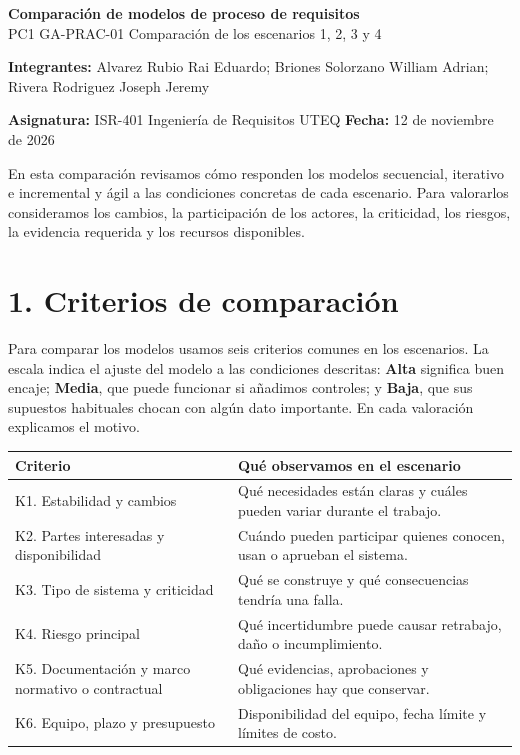 \documentclass[10pt,letterpaper]{article}
\newcommand{\separa}{\hspace{0.25em}\raisebox{0.25ex}{\rule{0.38ex}{0.38ex}}\hspace{0.25em}}
\newcommand{\titulo}[1]{\section*{\textcolor{verde}{#1}}}
\begin{document}
\par
\begin{center}
{\Large\bfseries\textcolor{verde}{Comparación de modelos de proceso de requisitos}}\\[3pt]
{\large PC1 \separa GA-PRAC-01 \separa Comparación de los escenarios 1, 2, 3 y 4}
\end{center}
\par
\vspace{3pt}
\par
\textbf{Integrantes:} Alvarez Rubio Rai Eduardo; Briones Solorzano William Adrian; Rivera Rodriguez Joseph Jeremy\\
\par
\textbf{Asignatura:} ISR-401 \separa Ingeniería de Requisitos \separa UTEQ \hfill \textbf{Fecha:} 12 de noviembre de 2026\\
\par
En esta comparación revisamos cómo responden los modelos secuencial, iterativo e incremental y ágil a las condiciones concretas de cada escenario. Para valorarlos consideramos los cambios, la participación de los actores, la criticidad, los riesgos, la evidencia requerida y los recursos disponibles.
\par
\titulo{1. Criterios de comparación}
\par
Para comparar los modelos usamos seis criterios comunes en los escenarios. La escala indica el ajuste del modelo a las condiciones descritas: \textbf{Alta} significa buen encaje; \textbf{Media}, que puede funcionar si añadimos controles; y \textbf{Baja}, que sus supuestos habituales chocan con algún dato importante. En cada valoración explicamos el motivo.
\par
\small
\par
\begin{tabularx}{\linewidth}{@{}p{3.4cm}Y@{}}
\color{white}\textbf{Criterio}&\color{white}\textbf{Qué observamos en el escenario}\\\midrule
K1. Estabilidad y cambios&Qué necesidades están claras y cuáles pueden variar durante el trabajo.\\
K2. Partes interesadas y disponibilidad&Cuándo pueden participar quienes conocen, usan o aprueban el sistema.\\
K3. Tipo de sistema y criticidad&Qué se construye y qué consecuencias tendría una falla.\\
K4. Riesgo principal&Qué incertidumbre puede causar retrabajo, daño o incumplimiento.\\
K5. Documentación y marco normativo o contractual&Qué evidencias, aprobaciones y obligaciones hay que conservar.\\
K6. Equipo, plazo y presupuesto&Disponibilidad del equipo, fecha límite y límites de costo.\\
\end{tabularx}
\end{document}
